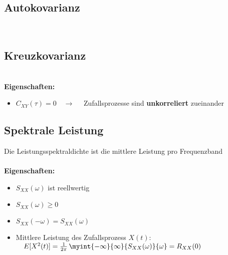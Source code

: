 			\begin{minipage}{\textwidth}
				\subsection{Autokovarianz}
					\vspace*{0.15cm}\\[0.2cm]
			\end{minipage}
			\begin{minipage}{\textwidth}
				\subsection{Kreuzkovarianz}
					\vspace*{0.15cm}\\[0.2cm]
					\textbf{Eigenschaften:}\\[-0.4cm]
					\begin{itemize}
						\item $C_{XY}(\tau) = 0 \quad\rightarrow\quad$ Zufallsprozesse sind \textbf{unkorreliert} zueinander\\[-0cm]
					\end{itemize}
			\end{minipage}
			\begin{minipage}{\textwidth}
				\subsection{Spektrale Leistung}
					\vspace*{0.15cm}
					Die Leistungsspektraldichte ist die mittlere Leistung pro Frequenzband\\[0.2cm]
					\\[0.4cm]
					\textbf{Eigenschaften:}\\[-0.4cm]
					\begin{itemize}
						\item $S_{XX}(\omega)$ ist reellwertig \\[-0.25cm]
						\item $S_{XX}(\omega)\geq 0$ \\[-0.25cm]
						\item $S_{XX}(-\omega) = S_{XX}(\omega)$\\[-0.25cm]
						\item Mittlere Leistung des Zufallsprozess $X(t)$:$\quad E[X^2(t)] = \frac{1}{2\pi}\,\myint{-\infty}{\infty}{S_{XX}(\omega)}{\omega} = R_{XX}(0)$
					\end{itemize}
			\end{minipage}
